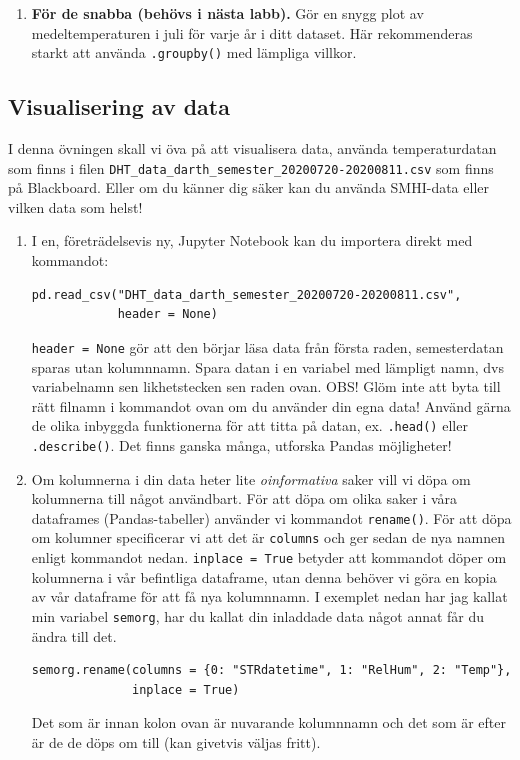 \documentclass{article}
\begin{document}
\begin{enumerate}
    \item \textbf{För de snabba (behövs i nästa labb).} Gör en snygg plot av medeltemperaturen i juli för varje år i ditt dataset. Här rekommenderas starkt att använda \verb+.groupby()+ med lämpliga villkor. 
\end{enumerate}

\subsection{Visualisering av data}
I denna övningen skall vi öva på att visualisera data, använda temperaturdatan som finns i filen \verb+DHT_data_darth_semester_20200720-20200811.csv+ som finns på Blackboard. Eller om du känner dig säker kan du använda SMHI-data eller vilken data som helst!
\begin{enumerate}
\item I en, företrädelsevis ny, Jupyter Notebook kan du  importera direkt med kommandot:
\begin{verbatim}
pd.read_csv("DHT_data_darth_semester_20200720-20200811.csv", 
            header = None)
\end{verbatim}
\verb+header = None+ gör att den börjar läsa data från första raden, semesterdatan sparas utan kolumnnamn. Spara datan i en variabel med lämpligt namn, dvs variabelnamn sen likhetstecken sen raden ovan. OBS! Glöm inte att byta till rätt filnamn i kommandot ovan om du använder din egna data! Använd gärna de olika inbyggda funktionerna för att titta på datan, ex. \verb+.head()+ eller \verb+.describe()+. Det finns ganska många, utforska Pandas möjligheter!
\item Om kolumnerna i din data heter lite \emph{oinformativa} saker vill vi döpa om kolumnerna till något användbart. För att döpa om olika saker i våra dataframes (Pandas-tabeller) använder vi kommandot \verb+rename()+. För att döpa om kolumner specificerar vi att det är \verb+columns+ och ger sedan de nya namnen enligt kommandot nedan. \verb+inplace = True+ betyder att kommandot döper om kolumnerna i vår befintliga dataframe, utan denna behöver vi göra en kopia av vår dataframe för att få nya kolumnnamn. I exemplet nedan har jag kallat min variabel \verb+semorg+, har du kallat din inladdade data något annat får du ändra till det.
\begin{verbatim}
semorg.rename(columns = {0: "STRdatetime", 1: "RelHum", 2: "Temp"}, 
              inplace = True)
\end{verbatim}
Det som är innan kolon ovan är nuvarande kolumnnamn och det som är efter är de de döps om till (kan givetvis väljas fritt).

\end{enumerate}
\end{document}
